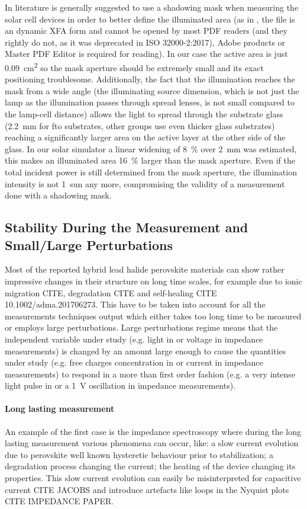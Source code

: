 In literature is generally suggested to use a shadowing mask when measuring the solar cell devices in order to better define the illuminated area (as in \cite{NatureResearch2017}, the file is an dynamic XFA form and cannot be opened by most PDF readers (and they rightly do not, as it was deprecated in ISO 32000-2:2017), Adobe products or Master PDF Editor is required for reading). In our case the active area is just \SI{0.09}{\square\cm} so the mask aperture should be extremely small and its exact positioning troublesome. Additionally, the fact that the illumination reaches the mask from a wide angle (the illuminating source dimension, which is not just the lamp as the illumination passes through spread lenses, is not small compared to the lamp-cell distance) allows the light to spread through the substrate glass (\SI{2.2}{\mm} for \gls{fto} substrates, other groups use even thicker glass substrates) reaching a significantly larger area on the active layer at the other side of the glass. In our solar simulator a linear widening of 8~\% over \SI{2}{\mm} was estimated, this makes an illuminated area 16~\% larger than the mask aperture. Even if the total incident power is still determined from the mask aperture, the illumination intensity is not 1~sun any more, compromising the validity of a measurement done with a shadowing mask.


\subsection{Stability During the Measurement and Small/Large Perturbations}

Most of the reported hybrid lead halide perovskite materials can show rather impressive changes in their structure on long time scales, for example due to ionic migration CITE, degradation CITE and self-healing CITE 10.1002/adma.201706273.
This have to be taken into account for all the measurements techniques output which either takes too long time to be measured or employs large perturbations. Large perturbations regime means that the independent variable under study (e.g. light in  or voltage in impedance measurements) is changed by an amount large enough to cause the quantities under study (e.g. free charges concentration in  or current in impedance measurements) to respond in a more than first order fashion (e.g. a very intense light pulse in  or a \SI{1}{\volt} oscillation in impedance measurements).

\paragraph{Long lasting measurement} An example of the first case is the impedance spectroscopy where during the long lasting measurement various phenomena can occur, like: a slow current evolution due to perovskite well known hysteretic behaviour prior to stabilization; a degradation process changing the current; the heating of the device changing its properties. This slow current evolution can easily be misinterpreted for capacitive current CITE JACOBS and introduce artefacts like loops in the Nyquist plots CITE IMPEDANCE PAPER.

